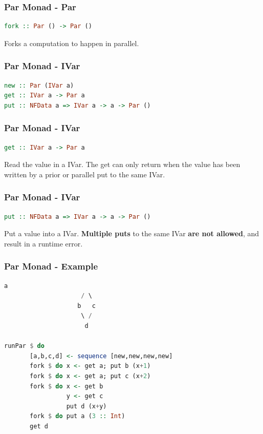 \documentclass[12pt, danish]{beamer}
\begin{document}
\begin{frame}[fragile]
  \frametitle{Par Monad - Par}
  \begin{lstlisting}[language=Haskell]
fork :: Par () -> Par ()
  \end{lstlisting}

  Forks a computation to happen in parallel.
\end{frame}

\begin{frame}[fragile]
  \frametitle{Par Monad - IVar}
  \begin{lstlisting}[language=Haskell]
new :: Par (IVar a)
get :: IVar a -> Par a
put :: NFData a => IVar a -> a -> Par ()
  \end{lstlisting}
\end{frame}

\begin{frame}[fragile]
  \frametitle{Par Monad - IVar}
  \begin{lstlisting}[language=Haskell]
get :: IVar a -> Par a  
  \end{lstlisting}

  Read the value in a IVar. The get can only return when the value 
  has been written by a prior or parallel put to the same IVar.
  
\end{frame}

\begin{frame}[fragile]
  \frametitle{Par Monad - IVar}
  \begin{lstlisting}[language=Haskell]
put :: NFData a => IVar a -> a -> Par ()
  \end{lstlisting} 
    
  Put a value into a IVar. \textbf{Multiple puts} to the same IVar
  \textbf{are not  allowed}, and result in a runtime error.
    
\end{frame}

\begin{frame}[fragile]
  \frametitle{Par Monad - Example}
  \begin{lstlisting}[language=Haskell]
                      a
                     / \  
                    b   c
                     \ /
                      d
  
runPar $ do
       [a,b,c,d] <- sequence [new,new,new,new]
       fork $ do x <- get a; put b (x+1)
       fork $ do x <- get a; put c (x+2)
       fork $ do x <- get b
                 y <- get c 
                 put d (x+y)
       fork $ do put a (3 :: Int)
       get d
  \end{lstlisting}
\end{frame}
\end{document}
